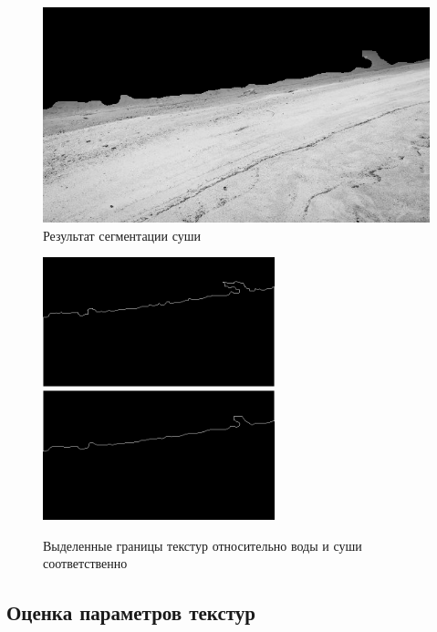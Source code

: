 \begin{figure}[H]
    \includegraphics[width=\textwidth]{../outputs/I2.png}
    \caption{Результат сегментации суши}
    \label{fig:р}
\end{figure}

\begin{figure}[hbt!]
    \centering
    \includegraphics[width=0.6\textwidth]{../outputs/image_countours_segmentation.png}
    \includegraphics[width=0.6\textwidth]{../outputs/image_countours2_segmentation.png}
    \caption{Выделенные границы текстур относительно воды и суши соответственно}
    \label{fig:stich_images}
\end{figure}

\pagebreak

\subsection{Оценка параметров текстур}

